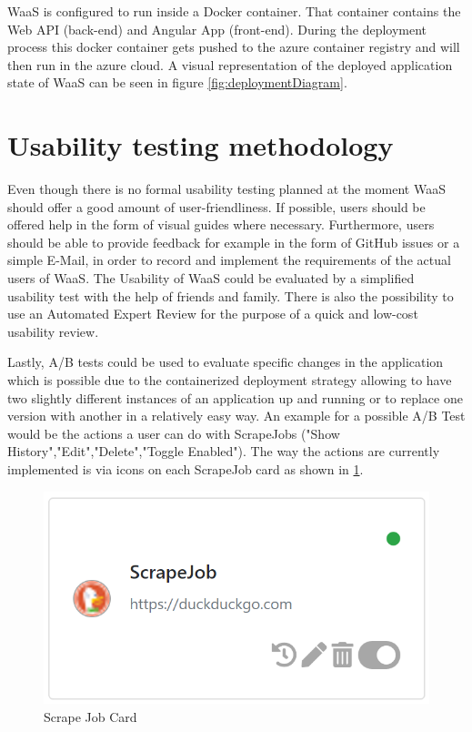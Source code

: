 \documentclass[titlepage, 12pt]{article}
\begin{document}
WaaS is configured to run inside a Docker container. That container contains the Web API (back-end) and Angular App (front-end). During the deployment process this docker container gets pushed to the azure container registry and will then run in the azure cloud. A visual representation of the deployed application state of WaaS can be seen in figure \ref{fig:deploymentDiagram}.

\pagebreak

\section {Usability testing methodology}
Even though there is no formal usability testing planned at the moment WaaS should offer a good amount of user-friendliness.
If possible, users should be offered help in the form of visual guides where necessary.
Furthermore, users should be able to provide feedback for example in the form of GitHub issues or a simple E-Mail, in order to record and implement the requirements of the actual users of WaaS.
The Usability of WaaS could be evaluated by a simplified usability test with the help of friends and family.
There is also the possibility to use an Automated Expert Review for the purpose of a quick and low-cost usability review.

Lastly, A/B tests could be used to evaluate specific changes in the application which is possible due to the containerized deployment strategy allowing to have two slightly different
instances of an application up and running or to replace one version with another in a relatively easy way. An example for a possible A/B Test would be the actions a user can do with ScrapeJobs ("Show History","Edit","Delete","Toggle Enabled"). The way the actions are currently implemented is via icons on each ScrapeJob card as shown in \ref{fig:scrapeJobCard}.

\begin{figure}[H]
  \centering
  \includegraphics[width=0.5\linewidth]{scrapeJobCard.png}
  \caption{Scrape Job Card}
  \label{fig:scrapeJobCard}
\end{figure}
\end{document}
